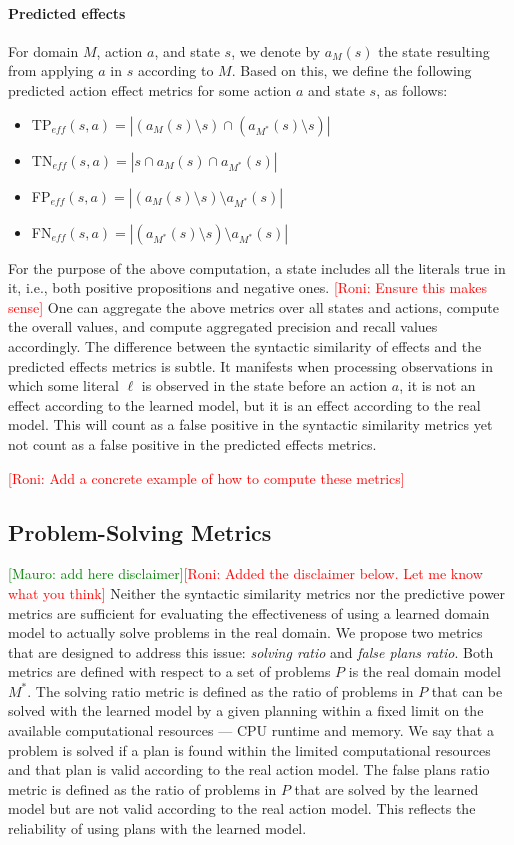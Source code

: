\documentclass{article}
\theoremstyle{definition}
\theoremstyle{remark}
\newcommand{\realm}{\ensuremath{M^*}\xspace}
\newcommand{\eff}{\ensuremath{\textit{eff}}\xspace}
\newcommand{\roni}[1]{{\textcolor{red}{[Roni: #1]}}}
\newcommand{\mauro}[1]{{\textcolor{green}{[Mauro: #1]}}}
\begin{document}
\paragraph{Predicted effects}
For domain $M$, action $a$, and state $s$, we denote by $a_M(s)$ the state resulting from applying $a$ in $s$ according to $M$. 
Based on this, we define the following predicted action effect metrics for some action $a$ and state $s$, as follows: 
\begin{itemize}
    \item TP$_{\eff}(s,a)=|(a_M(s)\setminus s)\cap (a_\realm(s)\setminus s)|$
    \item TN$_{\eff}(s,a)=|s \cap a_M(s) \cap a_\realm(s)|$
    \item FP$_{\eff}(s,a)=|(a_M(s)\setminus s)\setminus a_\realm(s)|$
    \item FN$_{\eff}(s,a)=|(a_\realm(s)\setminus s)\setminus a_\realm(s)|$
\end{itemize}
For the purpose of the above computation, a state includes all the literals true in it, i.e., both positive propositions and negative ones. 
\roni{Ensure this makes sense}
One can aggregate the above metrics over all states and actions, 
compute the overall values, and compute aggregated precision and recall values accordingly.  
The difference between the syntactic similarity of effects and the predicted effects metrics is subtle. 
It manifests when processing observations in which some literal $\ell$ is observed in the state before an action $a$, 
it is not an effect according to the learned model, but it is an effect according to the real model. 
This will count as a false positive in the syntactic similarity metrics yet not count as a false positive in the predicted effects metrics. 

\roni{Add a concrete example of how to compute these metrics}


\subsection{Problem-Solving Metrics}
\mauro{add here disclaimer}\roni{Added the disclaimer below. Let me know what you think}
Neither the syntactic similarity metrics nor the predictive power metrics are sufficient for evaluating the effectiveness of using a learned domain model to actually solve problems in the real domain. 
We propose two metrics that are designed to address this issue: \emph{solving ratio} and \emph{false plans ratio}. 
Both metrics are defined with respect to a set of problems $P$ is the real domain model $\realm$. 
The solving ratio metric is defined as the ratio of problems in $P$ that can be solved with the learned model by a given planning within a fixed limit on the available computational resources --- CPU runtime and memory. 
We say that a problem is solved if a plan is found within the limited computational resources and that plan is valid according to the real action model. 
The false plans ratio metric is defined as the ratio of problems in $P$ that are solved by the learned model but are not valid according to the real action model. This reflects the reliability of using plans with the learned model.
\end{document}

